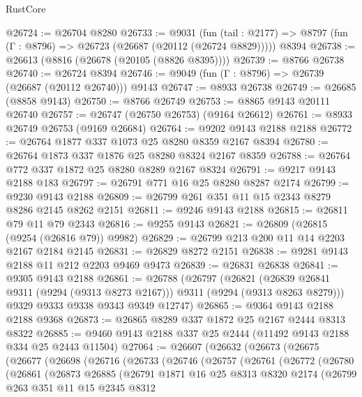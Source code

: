 \begin{lexlean}{RustCore}
\begin{coremodule}
@26724 := @26704 @8280
@26733 := @9031
    (fun (tail : @2177) => @8797 (fun (Γ : @8796) => @26723 (@26687 (@20112 (@26724 @8829)))))
    @8394
@26738 := @26613 (@8816 (@26678 (@20105 (@8826 @8395))))
@26739 := @8766 @26738
@26740 := @26724 @8394
@26746 := @9049 (fun (Γ : @8796) => @26739 (@26687 (@20112 @26740))) @9143
@26747 := @8933 @26738
@26749 := @26685 (@8858 @9143)
@26750 := @8766 @26749
@26753 := @8865 @9143 @20111 @26740
@26757 := @26747 (@26750 @26753) (@9164 @26612)
@26761 := @8933 @26749 @26753 (@9169 @26684)
@26764 := @9202 @9143 @2188 @2188
@26772 := @26764 @1877 @337 @1073 @25 @8280 @8359 @2167 @8394
@26780 := @26764 @1873 @337 @1876 @25 @8280 @8324 @2167 @8359
@26788 := @26764 @772 @337 @1872 @25 @8280 @8289 @2167 @8324
@26791 := @9217 @9143 @2188 @183
@26797 := @26791 @771 @16 @25 @8280 @8287 @2174
@26799 := @9230 @9143 @2188
@26809 := @26799 @261 @351 @11 @15 @2343 @8279 @8286 @2145 @8262 @2151
@26811 := @9246 @9143 @2188
@26815 := @26811 @79 @11 @79 @2343
@26816 := @9255 @9143
@26821 := @26809 (@26815 (@9254 (@26816 @79)) @9982)
@26829 := @26799 @213 @200 @11 @14 @2203 @2167 @2184 @2145
@26831 := @26829 @8272 @2151
@26838 := @9281 @9143 @2188 @11 @212 @2203 @9469 @9473
@26839 := @26831 @26838
@26841 := @9305 @9143 @2188
@26861 := @26788
    (@26797
      (@26821 (@26839 @26841 @9311 (@9294 (@9313 @8273 @2167))) @9311 (@9294 (@9313 @8263 @8279)))
      @9329
      @9333
      @9338
      @9343
      @9349
      @12747)
@26865 := @9364 @9143 @2188 @2188 @9368
@26873 := @26865 @8289 @337 @1872 @25 @2167 @2444 @8313 @8322
@26885 := @9460 @9143 @2188 @337 @25 @2444 (@11492 @9143 @2188 @334 @25 @2443 @11504)
@27064 := @26607
    (@26632
      (@26673
        (@26675
          (@26677
            (@26698
              (@26716
                (@26733
                  (@26746
                    (@26757
                      (@26761
                        (@26772
                          (@26780
                            (@26861
                              (@26873
                                @26885
                                (@26791
                                  @1871
                                  @16
                                  @25
                                  @8313
                                  @8320
                                  @2174
                                  (@26799
                                    @263
                                    @351
                                    @11
                                    @15
                                    @2345
                                    @8312

\end{coremodule}
\end{lexlean}
